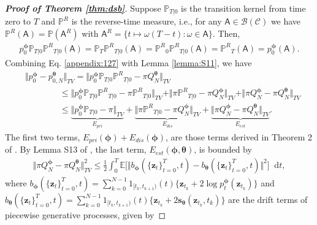 \documentclass{article}
\theoremstyle{definition}
\theoremstyle{remark}
\newcommand*\diff{\mathop{}\!\mathrm{d}}
\begin{document}
\begin{proof}[\textbf{Proof of Theorem \ref{thm:dsb}}]
		Suppose $\mathbb{P}_{T\vert 0}$ is the transition kernel from time zero to $T$ and $\mathbb{P}^{R}$ is the reverse-time measure, i.e., for any $\mathsf{A}\in\mathcal{B}(\mathcal{C})$ we have $\mathbb{P}^{R}(\mathsf{A})=\mathbb{P}(\mathsf{A}^{R})$ with $\mathsf{A}^{R}=\{t\mapsto \omega(T-t):\omega\in \mathsf{A}\}$. Then,
		\begin{align}\label{appendix:127}
		p_{0}^{\bm{\phi}}\mathbb{P}_{T\vert 0}{\mathbb{P}^{R}}_{T\vert 0}(\mathsf{A})=\mathbb{P}_{T}{\mathbb{P}^{R}}_{T\vert 0}(\mathsf{A})={\mathbb{P}^{R}}_{0}{\mathbb{P}^{R}}_{T\vert 0}(\mathsf{A})={\mathbb{P}^{R}}_{T}(\mathsf{A})=p_{0}^{\bm{\phi}}(\mathsf{A}).
		\end{align}
		Combining Eq. \eqref{appendix:127} with Lemma \ref{lemma:S11}, we have
		\begin{align*}
		&\Vert p_{0}^{\bm{\phi}}-p_{0,N}^{\bm{\theta}}\Vert_{TV}=\Vert p_{0}^{\bm{\phi}}\mathbb{P}_{T\vert 0}{\mathbb{P}^{R}}_{T\vert 0}-\pi Q_{N}^{\bm{\theta}}\Vert_{TV}\\
		&\quad\quad\quad\quad\le \Vert p_{0}^{\bm{\phi}}\mathbb{P}_{T\vert 0}{\mathbb{P}^{R}}_{T\vert 0}-\pi {\mathbb{P}^{R}}_{T\vert 0}\Vert_{TV}+\Vert \pi {\mathbb{P}^{R}}_{T\vert 0}-\pi Q_{N}^{\bm{\phi}}\Vert_{TV}+\Vert \pi Q_{N}^{\bm{\phi}}-\pi Q_{N}^{\bm{\theta}}\Vert_{TV}\\
		&\quad\quad\quad\quad\le \underbrace{\Vert p_{0}^{\bm{\phi}}\mathbb{P}_{T\vert 0}-\pi\Vert_{TV}}_{E_{pri}}+\underbrace{\Vert\pi{\mathbb{P}^{R}}_{T\vert 0}-\pi Q_{N}^{\bm{\phi}}\Vert_{TV}}_{E_{dis}}+\underbrace{\Vert\pi Q_{N}^{\bm{\phi}}-\pi Q_{N}^{\bm{\theta}}\Vert_{TV}}_{E_{est}}.
		\end{align*}
		The first two terms, $E_{pri}(\bm{\phi})+E_{dis}(\bm{\phi})$, are those terms derived in Theorem 2 of \citet{guth2022wavelet}. By Lemma S13 of \citet{de2021diffusion}, the last term, $E_{est}(\bm{\phi},\bm{\theta})$, is bounded by
		\begin{align*}
		\Vert\pi Q_{N}^{\bm{\phi}}-\pi Q_{N}^{\bm{\theta}}\Vert_{TV}^{2}\le\frac{1}{2}\int_{0}^{T}\mathbb{E}\big[\Vert b_{\bm{\phi}}(\{\mathbf{z}_{t}\}_{t=0}^{T},t)-b_{\bm{\theta}}(\{\mathbf{z}_{t}\}_{t=0}^{T},t)\Vert^{2}\big]\diff t,
		\end{align*}
		where $b_{\bm{\phi}}(\{\mathbf{z}_{t}\}_{t=0}^{T},t)=\sum_{k=0}^{N-1}1_{[t_{k},t_{k+1})}(t)\{\mathbf{z}_{t_{k}}+2\log{p_{t}^{\bm{\phi}}(\mathbf{z}_{t_{k}})}\}$ and $b_{\bm{\theta}}(\{\mathbf{z}_{t}\}_{t=0}^{T},t)=\sum_{k=0}^{N-1}1_{[t_{k},t_{k+1})}(t)\{\mathbf{z}_{t_{k}}+2\mathbf{s}_{\bm{\theta}}(\mathbf{z}_{t_{k}},t_{k})\}$ are the drift terms of piecewise generative processes, given by

\end{proof}
\end{document}
